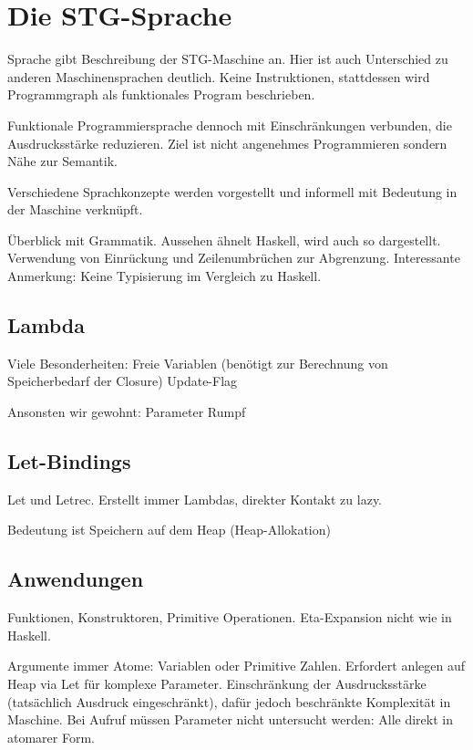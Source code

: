 
\chapter{Die STG-Sprache}\label{chap:stg}


Sprache gibt Beschreibung der STG-Maschine an.
Hier ist auch Unterschied zu anderen Maschinensprachen deutlich.
Keine Instruktionen, stattdessen wird Programmgraph als funktionales Program beschrieben.

Funktionale Programmiersprache dennoch mit Einschränkungen verbunden, die Ausdrucksstärke reduzieren.
Ziel ist nicht angenehmes Programmieren sondern Nähe zur Semantik.

Verschiedene Sprachkonzepte werden vorgestellt und informell mit Bedeutung in der Maschine verknüpft.

Überblick mit Grammatik.
Aussehen ähnelt Haskell, wird auch so dargestellt.
Verwendung von Einrückung und Zeilenumbrüchen zur Abgrenzung.
Interessante Anmerkung: Keine Typisierung im Vergleich zu Haskell.



\section{Lambda}

Viele Besonderheiten:
Freie Variablen (benötigt zur Berechnung von Speicherbedarf der Closure)
Update-Flag

Ansonsten wir gewohnt:
Parameter
Rumpf


\section{Let-Bindings}

Let und Letrec.
Erstellt immer Lambdas, direkter Kontakt zu lazy.

Bedeutung ist Speichern auf dem Heap (Heap-Allokation)


\section{Anwendungen}

Funktionen, Konstruktoren, Primitive Operationen.
Eta-Expansion nicht wie in Haskell. %

Argumente immer Atome: Variablen oder Primitive Zahlen.
Erfordert anlegen auf Heap via Let für komplexe Parameter.
Einschränkung der Ausdrucksstärke (tatsächlich Ausdruck eingeschränkt), dafür jedoch beschränkte Komplexität in Maschine.
Bei Aufruf müssen Parameter nicht untersucht werden: Alle direkt in atomarer Form.


